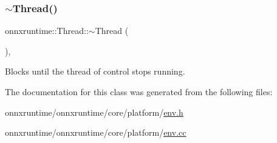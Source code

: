 \mbox{\label{classonnxruntime_1_1Thread_a9a39fa069f5482dec645baca35b2caa3}} 
\subsubsection{\texorpdfstring{$\sim$\+Thread()}{~Thread()}}
{\footnotesize\ttfamily onnxruntime\+::\+Thread\+::$\sim$\+Thread (\begin{DoxyParamCaption}{ }\end{DoxyParamCaption})\hspace{0.3cm}{\ttfamily [virtual]}, {\ttfamily [default]}}



Blocks until the thread of control stops running. 



The documentation for this class was generated from the following files\+:\begin{DoxyCompactItemize}
\item 
onnxruntime/onnxruntime/core/platform/\mbox{\hyperlink{env_8h}{env.\+h}}\item 
onnxruntime/onnxruntime/core/platform/\mbox{\hyperlink{env_8cc}{env.\+cc}}\end{DoxyCompactItemize}
